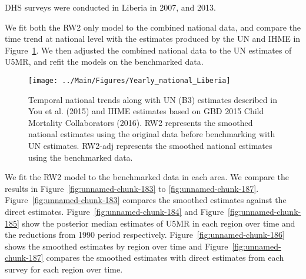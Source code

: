 \documentclass[12pt]{article}\usepackage[]{graphicx}\usepackage[]{color}
\newenvironment{knitrout}{}{} %
\begin{document}


DHS surveys were conducted in Liberia in 2007, and 2013.

We fit both the RW2 only model to the combined national data, and compare the time trend at national level with the estimates produced by the UN and IHME in Figure~\ref{fig:unnamed-chunk-182}. We then adjusted the combined national data to the UN estimates of U5MR, and refit the models on the benchmarked data. 

\begin{knitrout}
\color{fgcolor}\begin{figure}[bht]

{\centering \texttt{[image: ../Main/Figures/Yearly\_national\_Liberia]} 

}

\caption[Temporal national trends along with UN (B3) estimates described in You et al]{Temporal national trends along with UN (B3) estimates described in You et al. (2015) and IHME estimates based on GBD 2015 Child Mortality Collaborators (2016). RW2 represents the smoothed national estimates using the original data before benchmarking with UN estimates. RW2-adj represents the smoothed national estimates using the benchmarked data.}\label{fig:unnamed-chunk-182}
\end{figure}


\end{knitrout}
 

We fit the RW2 model to the benchmarked data in each area. 
We compare the results in Figure~\ref{fig:unnamed-chunk-183} to \ref{fig:unnamed-chunk-187}.
Figure~\ref{fig:unnamed-chunk-183} compares the smoothed estimates against the direct estimates. Figure~\ref{fig:unnamed-chunk-184} and Figure~\ref{fig:unnamed-chunk-185} show the posterior median estimates of U5MR in each region over time and the reductions from 1990 period respectively.
Figure~\ref{fig:unnamed-chunk-186} shows the smoothed estimates by region over time and Figure~\ref{fig:unnamed-chunk-187} compares the smoothed estimates with direct estimates from each survey for each region over time.


\end{document}
